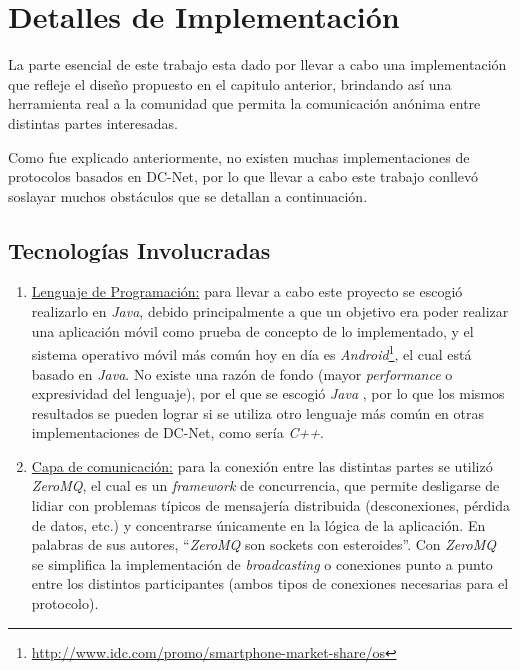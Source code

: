 \chapter{Detalles de Implementación}\label{cap4}

La parte esencial de este trabajo esta dado por llevar a cabo una 
implementación que refleje el diseño propuesto en el capitulo anterior, 
brindando así una herramienta real a la comunidad que permita la comunicación 
anónima entre distintas partes interesadas.

Como fue explicado anteriormente, no existen muchas implementaciones de 
protocolos basados en DC-Net, por lo que llevar a cabo este trabajo conllevó 
soslayar muchos obstáculos que se detallan a continuación.

\section{Tecnologías Involucradas}

\begin{enumerate}
    \item \underline{Lenguaje de Programación:} para llevar a cabo este 
    proyecto se escogió realizarlo en \emph{Java}, debido principalmente a que 
    un objetivo era poder realizar una aplicación móvil como prueba de 
    concepto de lo implementado, y el sistema operativo móvil más común hoy en 
    día es \emph{Android}\footnote{\url{http://www.idc.com/promo/smartphone-market-share/os}}, el 
    cual está basado en \emph{Java}. No existe una razón de fondo (mayor \emph{
    performance} o expresividad del lenguaje), por el que se escogió \emph{Java
    }, por lo que los mismos resultados se pueden lograr si se utiliza otro 
    lenguaje más común en otras implementaciones de DC-Net, como sería \emph{
    C++}.

    \item \underline{Capa de comunicación:} para la conexión entre las 
    distintas partes se utilizó \emph{ZeroMQ}, el cual es un \emph{framework} 
    de concurrencia, que permite desligarse de lidiar con problemas típicos de 
    mensajería distribuida (desconexiones, pérdida de datos, etc.) y 
    concentrarse únicamente en la lógica de la aplicación. En palabras de sus 
    autores, ``\emph{ZeroMQ} son sockets con esteroides''. Con \emph{ZeroMQ} 
    se simplifica la implementación de \emph{broadcasting} o conexiones punto 
    a punto entre los distintos participantes (ambos tipos de conexiones 
    necesarias para el protocolo).
\end{enumerate}

